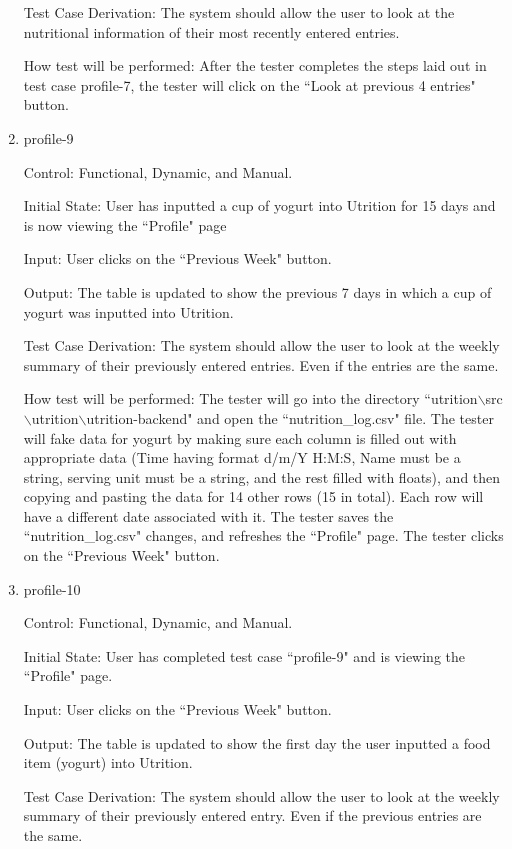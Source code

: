 \documentclass[12pt, titlepage]{article}
\begin{document}
\begin{enumerate}
		Test Case Derivation: The system should allow the user to look at the nutritional information of their most recently entered entries.
		
		How test will be performed: After the tester completes the steps laid out in test case profile-7, the tester will click on the ``Look at previous 4 entries" button.
		
		\item{profile-9\\}
		
		Control: Functional, Dynamic, and Manual.
		
		Initial State: User has inputted a cup of yogurt into Utrition for 15 days and is now viewing the ``Profile" page
		
		Input: User clicks on the ``Previous Week" button.
		
		Output: The table is updated to show the previous 7 days in which a cup of yogurt was inputted into Utrition. 
		
		Test Case Derivation: The system should allow the user to look at the weekly summary of their previously entered entries. Even if the entries are the same.
		
		How test will be performed: The tester will go into the directory ``utrition$\backslash$src$\backslash$utrition$\backslash$utrition-backend" and open the ``nutrition\_log.csv" file. The tester will fake data for yogurt by making sure each column is filled out with appropriate data (Time having format d/m/Y H:M:S, Name must be a string, serving unit must be a string, and the rest filled with floats), and then copying and pasting the data for 14 other rows (15 in total). Each row will have a different date associated with it. The tester saves the ``nutrition\_log.csv" changes, and refreshes the ``Profile" page. The tester clicks on the ``Previous Week" button.
		
		\item{profile-10\\}
		
		Control: Functional, Dynamic, and Manual.
		
		Initial State: User has completed test case ``profile-9" and is viewing the ``Profile" page.
		
		Input: User clicks on the ``Previous Week" button.
		
		Output: The table is updated to show the first day the user inputted a food item (yogurt) into Utrition.
		
		Test Case Derivation: The system should allow the user to look at the weekly summary of their previously entered entry. Even if the previous entries are the same.
		

\end{enumerate}
\end{document}

